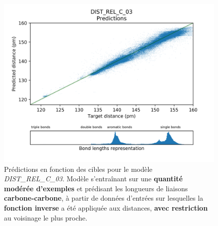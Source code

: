 \begin{figure}[!h]
	\centering
	
	\includegraphics[scale=0.75]{../figures/DIST_REL_C_03/DIST_REL_C_03_preds_targets.png}	
	
	\caption{Prédictions en fonction des cibles pour le modèle \emph{DIST\_REL\_C\_03}. Modèle s'entraînant sur une \textbf{quantité modérée d'exemples} et prédisant les longueurs de liaisons \textbf{carbone-carbone}, à partir de données d'entrées sur lesquelles la \textbf{fonction inverse} a été appliquée aux distances, \textbf{avec restriction} au voisinage le plus proche.}
	
\end{figure}

